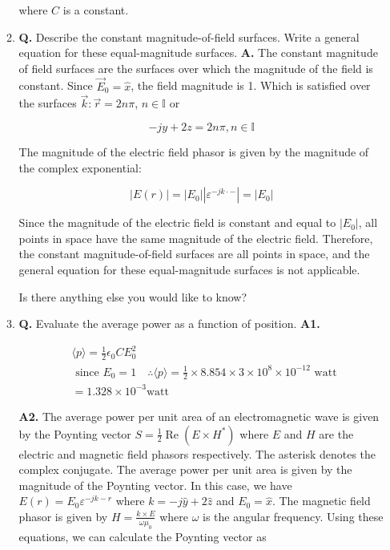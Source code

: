 \documentclass[main.tex]{subfiles}
\begin{document}
\begin{enumerate}
\begin{enumerate}
        where $C$ is a constant.
        
        \item \textbf{Q.} Describe the constant magnitude-of-field surfaces. Write a general equation for these equal-magnitude surfaces. \textbf{A.} The constant magnitude of field surfaces are the surfaces over which the magnitude of the field is constant. Since $\vec{E}_0=\hat{x}$, the field magnitude is 1. Which is satisfied over the surfaces $\vec{k}: \vec{r}=2 n \pi$, $n \in \mathbb{I}$ or
        
        $$
        -j y+2 z=2 n \pi, n \in \mathbb{I}
        $$
        
        The magnitude of the electric field phasor is given by the magnitude of the complex exponential:
        
        $$
        |E(r)|=\left|E_0\right|\left|\varepsilon^{-j k \cdot-}\right|=\left|E_0\right|
        $$
        
        Since the magnitude of the electric field is constant and equal to $\left|E_0\right|$, all points in space have the same magnitude of the electric field. Therefore, the constant magnitude-of-field surfaces are all points in space, and the general equation for these equal-magnitude surfaces is not applicable.
        
        Is there anything else you would like to know?
        
        \item \textbf{Q.} Evaluate the average power as a function of position. \textbf{A1.} 
        
        $$
        \begin{aligned}
        & \langle p\rangle=\frac{1}{2} \epsilon_0 C E_0^2 \\
        & \text { since } E_0=1 \quad \therefore\langle p\rangle=\frac{1}{2} \times 8.854 \times 3 \times 10^8 \times 10^{-12} \text { watt } \\
        & =1.328 \times 10^{-3} \mathrm{watt}
        \end{aligned}
        $$

        \textbf{A2.} The average power per unit area of an electromagnetic wave is given by the Poynting vector $S=\frac{1}{2} \operatorname{Re}\left(E \times H^*\right)$ where $E$ and $H$ are the electric and magnetic field phasors respectively. The asterisk denotes the complex conjugate. The average power per unit area is given by the magnitude of the Poynting vector. In this case, we have $E(r)=E_0 \varepsilon^{-j k-r}$ where $k=-j \hat{y}+2 \hat{z}$ and $E_0=\hat{x}$. The magnetic field phasor is given by $H=\frac{k \times E}{\omega \mu_0}$ where $\omega$ is the angular frequency. Using these equations, we can calculate the Poynting vector as
        

\end{enumerate}
\end{enumerate}
\end{document}
